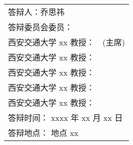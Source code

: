 \begin{titlepage}
\begin{center}
		\vspace{6cm}
		{\sanhao
			\begin{center} \renewcommand{\arraystretch}{1.5}
				\begin{tabular}{ll}
					\multicolumn{2}{l}{答辩人：乔思祎}\\
					\multicolumn{2}{l}{答辩委员会委员：}\\
					\multicolumn{1}{r}{西安交通大学 xx 教授：} & \underline{\hspace{8em}} (主席) \\
					\multicolumn{1}{r}{西安交通大学 xx 教授：} & \underline{\hspace{8em}} \\ 
					\multicolumn{1}{r}{\hspace{2em}西安交通大学 xx 教授：} & \underline{\hspace{8em}} \\
					\multicolumn{1}{r}{西安交通大学 xx 教授：} & \underline{\hspace{8em}} \\
					\multicolumn{1}{r}{西安交通大学 xx 教授：} & \underline{\hspace{8em}} \\
					\multicolumn{2}{l}{答辩时间： xxxx 年 xx 月 xx 日}\\
					\multicolumn{2}{l}{答辩地点： 地点 xx}\\
				\end{tabular} \renewcommand{\arraystretch}{1}
			\end{center} 
		}
	\end{center}
	\clearpage{\pagestyle{empty}\cleardoublepage}
\end{titlepage}
